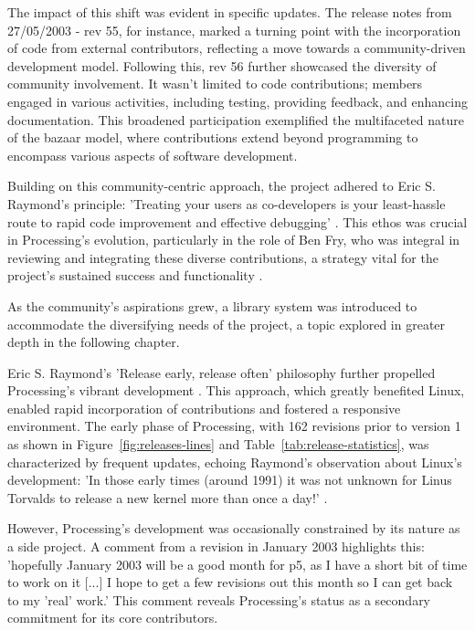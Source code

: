 The impact of this shift was evident in specific updates. The release notes from 27/05/2003 - rev 55, for instance, marked a turning point with the incorporation of code from external contributors, reflecting a move towards a community-driven development model. Following this, rev 56 further showcased the diversity of community involvement. It wasn't limited to code contributions; members engaged in various activities, including testing, providing feedback, and enhancing documentation. This broadened participation exemplified the multifaceted nature of the bazaar model, where contributions extend beyond programming to encompass various aspects of software development.

Building on this community-centric approach, the project adhered to Eric S. Raymond's principle: 'Treating your users as co-developers is your least-hassle route to rapid code improvement and effective debugging' \parencite[27]{raymondCathedralBazaar1999}. This ethos was crucial in Processing's evolution, particularly in the role of Ben Fry, who was integral in reviewing and integrating these diverse contributions, a strategy vital for the project's sustained success and functionality \parencite{Processing4CONTRIBUTINGMd}.

As the community's aspirations grew, a library system was introduced to accommodate the diversifying needs of the project, a topic explored in greater depth in the following chapter.

Eric S. Raymond's 'Release early, release often' philosophy further propelled Processing's vibrant development \parencite[28]{raymondCathedralBazaar1999}. This approach, which greatly benefited Linux, enabled rapid incorporation of contributions and fostered a responsive environment. The early phase of Processing, with 162 revisions prior to version 1 as shown in Figure~\ref{fig:releases-lines} and Table~\ref{tab:release-statistics}, was characterized by frequent updates, echoing Raymond's observation about Linux's development: 'In those early times (around 1991) it was not unknown for Linus Torvalds to release a new kernel more than once a day!' \parencite[28]{raymondCathedralBazaar1999}.

However, Processing's development was occasionally constrained by its nature as a side project. A comment from a revision in January 2003 highlights this: 'hopefully January 2003 will be a good month for p5, as I have a short bit of time to work on it [...] I hope to get a few revisions out this month so I can get back to my 'real' work.' This comment reveals Processing's status as a secondary commitment for its core contributors.

